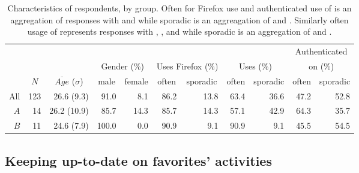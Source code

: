 \begin{table}
  \begin{whole}
  \begin{tabular}{rrrrrrrrrrr}

    &
    &
    &
    &
    &
    &
    &
    &
    &
    \multicolumn{2}{c}{Authenticated} \\

    &
    &
    &
    \multicolumn{2}{c}{Gender (\%)} &
    \multicolumn{2}{c}{Uses Firefox (\%)} &
    \multicolumn{2}{c}{Uses \urort{} (\%)} &
    \multicolumn{2}{c}{on \urort{} (\%)} \\

    &
    \multicolumn{1}{c}{$N$} &
    \multicolumn{1}{c}{$\overline{Age}$ ($\sigma$)} &
    \multicolumn{1}{c}{male} &
    \multicolumn{1}{c}{female} &
    \multicolumn{1}{c}{often} &
    \multicolumn{1}{c}{sporadic} &
    \multicolumn{1}{c}{often} &
    \multicolumn{1}{c}{sporadic} &
    \multicolumn{1}{c}{often} &
    \multicolumn{1}{c}{sporadic} \\

    \cmidrule(lr){2-11}

    All &
    123 &
    26.6 (9.3)&
    91.0 &
    8.1 &
    86.2 &
    13.8 &
    63.4 &
    36.6 &
    47.2 &
    52.8 \\

    $A$ &
    14 &
    26.2 (10.9) &
    85.7 &
    14.3 &
    85.7 &
    14.3 &
    57.1 &
    42.9 &
    64.3 &
    35.7 \\

    $B$ &
    11 &
    24.6 (7.9) &
    100.0 &
    0.0 &
    90.9 &
    9.1 &
    90.9 &
    9.1 &
    45.5 &
    54.5 \\

  \end{tabular}
  \caption[Characteristics of Respondents]{%
    Characteristics of respondents, by group. Often for Firefox use and
    authenticated use of \urort{} is an aggregation of responses with
     and  while sporadic is an aggreagation of
     and . Similarly often usage of
    \urort{} represents responses with , ,
    and  while sporadic is an aggregation of
     and .
  }
  \label{table:respondent.profiles}
  \end{whole}
\end{table}
\subsection{Keeping up-to-date on favorites' activities}

